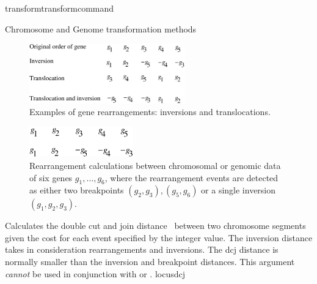 \begin{command}{transform}{transformcommand}
\begin{arguments}
\begin{argumentgroup}{Chromosome and Genome transformation methods}
		    \begin{figure} [!htbp]
   		        \begin{center}
        		    \includegraphics[width=0.6\textwidth]{doc/figures/genomeRearrangement.pdf}
    		    \end{center}
    		    \caption{Examples of gene rearrangements: inversions and translocations.}
		        \label{fig:genomeRearrangement}
		    \end{figure}

		    \begin{figure}[!htbp]
		        \begin{center}
        		    \includegraphics[width=0.4\textwidth]{doc/figures/breakpointDis.pdf}
      		    \end{center}
		        \caption{Rearrangement calculations between chromosomal or genomic data of six genes $g_1, \ldots, g_6$,
                    where the rearrangement events are detected as either two breakpoints $(g_2, g_3), (g_5, g_6)$
                    or a single inversion $(g_1, g_2, g_3)$.}
                \label{fig:distance}
		    \end{figure}
		
	        \begin{description}                 
                            
                    {Calculates the double cut and join
                    distance~\cite{yancopoulosetal2005}
                    between two chromosome segments given the cost for each
                    event specified by the integer value. The inversion distance
                    takes in consideration rearrangements and
                    inversions. The dcj distance is normally smaller than
                    the inversion and breakpoint distances.
                    This argument \emph{cannot} be used in conjunction with
                     or
                    .} 
                    {locusdcj}
                        

\end{description}
\end{argumentgroup}
\end{arguments}
\end{command}
